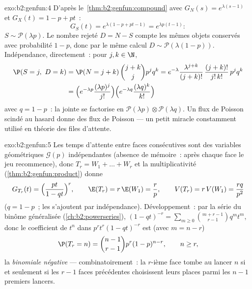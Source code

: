 \begin{solution}{exo:b2:genfun:4}
D'après le~\cref{thm:b2:genfun:compound} avec $G_N(s) = e^{\lambda(s-1)}$
et $G_X(t) = 1 - p + pt$~:
\[
G_S(t) = e^{\lambda(1 - p + pt - 1)} = e^{\lambda p(t - 1)} :
\]
$S \sim \mathcal{P}(\lambda p)$. Le nombre rejeté $D = N - S$
compte les mêmes objets conservés avec probabilité $1 - p$, donc par le
même calcul $D \sim \mathcal{P}(\lambda(1 - p))$.
Indépendance, directement~: pour $j, k \in \N$,
\begin{align*}
\P(S = j,\ D = k)
&= \P(N = j + k)\,\binom{j+k}{j}p^jq^k
= e^{-\lambda}\frac{\lambda^{j+k}}{(j+k)!}\,
\frac{(j+k)!}{j!\,k!}\,p^jq^k\\
&= \Bigl(e^{-\lambda p}\frac{(\lambda p)^j}{j!}\Bigr)
\Bigl(e^{-\lambda q}\frac{(\lambda q)^k}{k!}\Bigr)
\end{align*}
avec $q = 1 - p$~: la  jointe se factorise en
$\mathcal{P}(\lambda p) \otimes \mathcal{P}(\lambda q)$. Un flux de
Poisson scindé au hasard donne des flux de Poisson \emph{}
--- un petit miracle constamment utilisé en théorie des files
d'attente.
\end{solution}

\begin{solution}{exo:b2:genfun:5}
Les temps d'attente entre faces consécutives sont des variables
géométriques $\mathcal{G}(p)$ indépendantes (absence de mémoire~:
après chaque face le jeu recommence), donc $T_r = W_1 + \dots + W_r$ et
la multiplicativité (\cref{thm:b2:genfun:product}) donne
\[
G_{T_r}(t) = \Bigl(\frac{pt}{1 - qt}\Bigr)^{r},
\qquad
\E(T_r) = r\,\E(W_1) = \frac rp,
\qquad
V(T_r) = r\,V(W_1) = \frac{rq}{p^2}
\]
($q = 1 - p$~; les  s'ajoutent par indépendance).
Développement~: par la série du binôme généralisée
(\cref{ch:b2:powerseries}), $(1 - qt)^{-r} = \sum_{m\geq0}
\binom{m + r - 1}{r - 1}q^mt^m$, donc le coefficient de $t^n$ dans
$p^rt^r(1 - qt)^{-r}$ est (avec $m = n - r$)
\[
\P(T_r = n) = \binom{n-1}{r-1}p^r(1-p)^{n-r},
\qquad n \geq r ,
\]
la  \emph{binomiale négative} --- combinatoirement~: la $r$-ième
face tombe au lancer $n$ si et seulement si les $r - 1$ faces
précédentes choisissent leurs places parmi les $n - 1$ premiers
lancers.
\end{solution}

